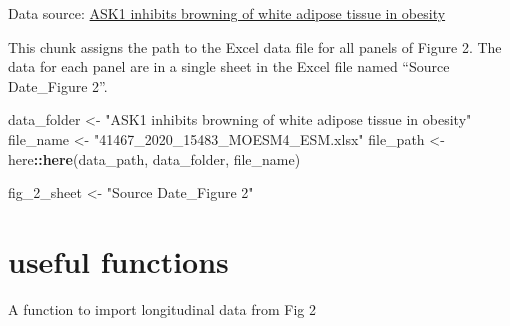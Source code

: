 \documentclass[]{book}
\newenvironment{Shaded}{\begin{snugshade}}{\end{snugshade}}
\newcommand{\CommentTok}[1]{\textcolor[rgb]{0.56,0.35,0.01}{\textit{#1}}}
\newcommand{\ControlFlowTok}[1]{\textcolor[rgb]{0.13,0.29,0.53}{\textbf{#1}}}
\newcommand{\DataTypeTok}[1]{\textcolor[rgb]{0.13,0.29,0.53}{#1}}
\newcommand{\DecValTok}[1]{\textcolor[rgb]{0.00,0.00,0.81}{#1}}
\newcommand{\ErrorTok}[1]{\textcolor[rgb]{0.64,0.00,0.00}{\textbf{#1}}}
\newcommand{\KeywordTok}[1]{\textcolor[rgb]{0.13,0.29,0.53}{\textbf{#1}}}
\newcommand{\NormalTok}[1]{#1}
\newcommand{\OperatorTok}[1]{\textcolor[rgb]{0.81,0.36,0.00}{\textbf{#1}}}
\newcommand{\OtherTok}[1]{\textcolor[rgb]{0.56,0.35,0.01}{#1}}
\newcommand{\StringTok}[1]{\textcolor[rgb]{0.31,0.60,0.02}{#1}}
\begin{document}
Data source: \href{https://www.nature.com/articles/s41467-020-15483-7}{ASK1 inhibits browning of white adipose tissue in obesity}

This chunk assigns the path to the Excel data file for all panels of Figure 2. The data for each panel are in a single sheet in the Excel file named ``Source Date\_Figure 2''.

\begin{Shaded}
\begin{Highlighting}[]
\NormalTok{data_folder <-}\StringTok{ "ASK1 inhibits browning of white adipose tissue in obesity"}
\NormalTok{file_name <-}\StringTok{ "41467_2020_15483_MOESM4_ESM.xlsx"}
\NormalTok{file_path <-}\StringTok{ }\NormalTok{here}\OperatorTok{::}\KeywordTok{here}\NormalTok{(data_path, data_folder, file_name)}
  
\NormalTok{fig_}\DecValTok{2}\NormalTok{_sheet <-}\StringTok{ "Source Date_Figure 2"}
\end{Highlighting}
\end{Shaded}

\hypertarget{useful-functions}{%
\section{useful functions}\label{useful-functions}}

A function to import longitudinal data from Fig 2

\begin{Shaded}
\end{Shaded}
\end{document}
